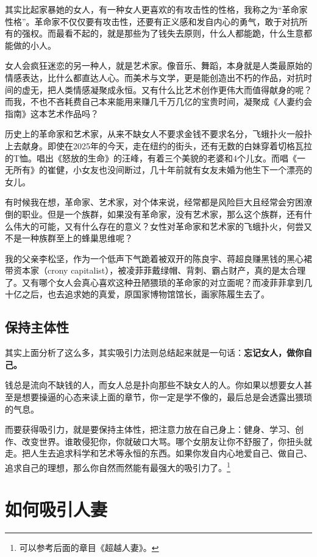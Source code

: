 其实比起家暴她的女人，有一种女人更喜欢的有攻击性的性格，我称之为``革命家性格''。革命家不仅仅要有攻击性，还要有正义感和发自内心的勇气，敢于对抗所有的强权。而最看不起的，就是那些为了钱失去原则，什么人都能跪，什么生意都能做的小人。

女人会疯狂迷恋的另一种人，就是艺术家。像音乐、舞蹈，本身就是人类最原始的情感表达，比什么都直达人心。而美术与文学，更是能创造出不朽的作品，对抗时间的虚无，把人类情感凝聚成永恒。又有什么比艺术创作更伟大而值得献身的呢？而我，不也不吝耗费自己本来能用来赚几千万几亿的宝贵时间，凝聚成《人妻约会指南》这本艺术作品吗？

历史上的革命家和艺术家，从来不缺女人不要求金钱不要求名分，飞蛾扑火一般扑上去献身。即使在2025年的今天，走在纽约的街头，还有无数的白妹穿着切格瓦拉的T恤。唱出《怒放的生命》的汪峰，有着三个美貌的老婆和4个儿女。而唱《一无所有》的崔健，小女友也没间断过，几十年前就有女友未婚为他生下一个漂亮的女儿。

有时候我在想，革命家、艺术家，对个体来说，经常都是风险巨大且经常会穷困潦倒的职业。但是一个族群，如果没有革命家，没有艺术家，那么这个族群，还有什么伟大的可能，又有什么存在的意义？女性对革命家和艺术家的飞蛾扑火，何尝又不是一种族群至上的蜂巢思维呢？

我的父亲李松坚，作为一个低声下气跪着被双开的陈良宇、蒋超良赚黑钱的黑心裙带资本家（crony capitalist），被凌菲菲戴绿帽、背刺、霸占财产，真的是太合理了。又有哪个女人会真心喜欢这种丑陋猥琐的革命家的对立面呢？而凌菲菲拿到几十亿之后，也去追求她的真爱，原国家博物馆馆长，画家陈履生去了。

\subsection{保持主体性}

其实上面分析了这么多，其实吸引力法则总结起来就是一句话：\textbf{忘记女人，做你自己。}

钱总是流向不缺钱的人，而女人总是扑向那些不缺女人的人。你如果以想要女人甚至是想要操逼的心态来读上面的章节，你一定是学不像的，最后总是会透露出猥琐的气息。

而要获得吸引力，就是要保持主体性，把注意力放在自己身上：健身、学习、创作、改变世界。谁敢侵犯你，你就破口大骂。哪个女朋友让你不舒服了，你扭头就走。把人生去追求科学和艺术等永恒的东西。如果你发自内心地爱自己、做自己、追求自己的理想，那么你自然而然能有最强大的吸引力了。\footnote{可以参考后面的章目《超越人妻》。}

\section{如何吸引人妻}

